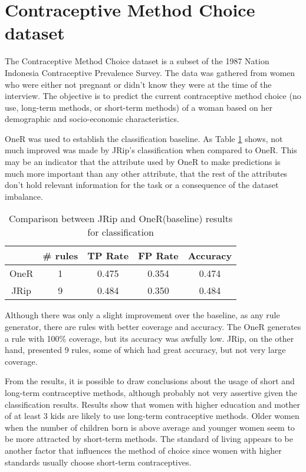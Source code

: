 \documentclass{article}
\begin{document}
\section*{Contraceptive Method Choice dataset}

The Contraceptive Method Choice dataset is a subset of the 1987 Nation Indonesia Contraceptive Prevalence Survey. The data was gathered from women who were either not pregnant or didn't know they were at the time of the interview. The objective is to predict the current contraceptive method choice (no use, long-term methods, or short-term methods) of a woman based on her demographic and socio-economic characteristics.

OneR was used to establish the classification baseline. As Table \ref{tab:cmc} shows, not much improved was made by JRip's classification when compared to OneR. This may be an indicator that the attribute used by OneR to make predictions is much more important than any other attribute, that the rest of the attributes don't hold relevant information for the task or a consequence of the dataset imbalance.

\begin{table}[htbp]
    \centering
    \begin{tabular}{c|c|c|c|c}
         & \# rules & TP Rate & FP Rate & Accuracy \\ \hline
         OneR & 1 & 0.475 & 0.354 & 0.474 \\
         JRip & 9 & 0.484 & 0.350 & 0.484 
    \end{tabular}
    \caption{Comparison between JRip and OneR(baseline) results for classification}
    \label{tab:cmc}
\end{table}

Although there was only a slight improvement over the baseline, as any rule generator, there are rules with better coverage and accuracy. The OneR generates a rule with 100\% coverage, but its accuracy was awfully low. JRip, on the other hand, presented 9 rules, some of which had great accuracy, but not very large coverage.

From the results, it is possible to draw conclusions about the usage of short and long-term contraceptive methods, although probably not very assertive given the classification results. Results show that women with higher education and mother of at least 3 kids are likely to use long-term contraceptive methods. Older women when the number of children born is above average and younger women seem to be more attracted by short-term methods. The standard of living appears to be another factor that influences the method of choice since women with higher standards usually choose short-term contraceptives.
\end{document}
